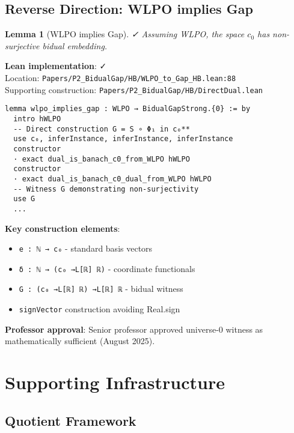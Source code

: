 \documentclass[11pt]{article}
\newtheorem{lemma}[theorem]{Lemma}
\theoremstyle{definition}
\theoremstyle{remark}
\newcommand{\leanok}{\textcolor{green!70!black}{✓}}
\newcommand{\leanloc}[1]{\texttt{\footnotesize\color{blue!60!black}#1}}
\begin{document}
\subsection{Reverse Direction: WLPO implies Gap}

\begin{lemma}[WLPO implies Gap]\label{lem:wlpo-gap} \leanok
Assuming WLPO, the space \(c_0\) has non-surjective bidual embedding.
\end{lemma}

\begin{mdframed}[style=okbox]
\textbf{Lean implementation}: \leanok\\
Location: \leanloc{Papers/P2\_BidualGap/HB/WLPO\_to\_Gap\_HB.lean:88}\\
Supporting construction: \leanloc{Papers/P2\_BidualGap/HB/DirectDual.lean}\\
\begin{verbatim}
lemma wlpo_implies_gap : WLPO → BidualGapStrong.{0} := by
  intro hWLPO
  -- Direct construction G = S ∘ Φ₁ in c₀**
  use c₀, inferInstance, inferInstance, inferInstance
  constructor
  · exact dual_is_banach_c0_from_WLPO hWLPO
  constructor  
  · exact dual_is_banach_c0_dual_from_WLPO hWLPO
  -- Witness G demonstrating non-surjectivity
  use G
  ...
\end{verbatim}

\textbf{Key construction elements}:
\begin{itemize}
\item \texttt{e : ℕ → c₀} - standard basis vectors
\item \texttt{δ : ℕ → (c₀ →L[ℝ] ℝ)} - coordinate functionals
\item \texttt{G : (c₀ →L[ℝ] ℝ) →L[ℝ] ℝ} - bidual witness
\item \texttt{signVector} construction avoiding Real.sign
\end{itemize}

\textbf{Professor approval}: Senior professor approved universe-0 witness as mathematically sufficient (August 2025).
\end{mdframed}

\section{Supporting Infrastructure}\label{sec:infrastructure}

\subsection{Quotient Framework}
\end{document}
